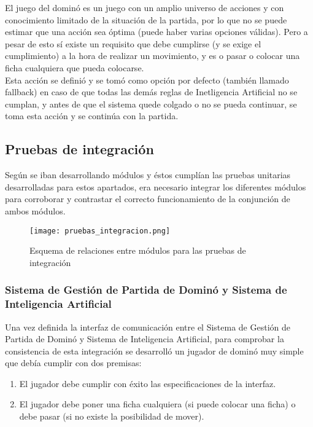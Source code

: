 El juego del dominó es un juego con un amplio universo de acciones y con conocimiento limitado de la situación de la partida,
por lo que no se puede estimar que una acción sea óptima (puede haber varias opciones válidas). Pero a pesar de esto sí existe
un requisito que debe cumplirse (y se exige el cumplimiento) a la hora de realizar un movimiento, y es o pasar o colocar una
ficha cualquiera que pueda colocarse. \\

Esta acción se definió y se tomó como opción por defecto (también llamado fallback) en caso de que todas las demás reglas
de Inetligencia Artificial no se cumplan, y antes de que el sistema quede colgado o no se pueda continuar, se toma esta acción y se continúa
con la partida.


\subsection{Pruebas de integración}

Según se iban desarrollando módulos y éstos cumplían las pruebas unitarias desarrolladas para estos apartados, era necesario
integrar los diferentes módulos para corroborar y contrastar el correcto funcionamiento de la conjunción de ambos módulos.

\begin{figure}[h]
  \label{pruebas_integracion}
  \begin{center}
    \texttt{[image: pruebas\_integracion.png]}
  \end{center}
  \caption{Esquema de relaciones entre módulos para las pruebas de integración}
\end{figure}

\subsubsection{Sistema de Gestión de Partida de Dominó y Sistema de Inteligencia Artificial}

Una vez definida la interfaz de comunicación entre el Sistema de Gestión de Partida de Dominó y Sistema de Inteligencia
Artificial, para comprobar la consistencia de esta integración se desarrolló un jugador de dominó muy simple que debía
cumplir con dos premisas:

\begin{enumerate}
    \item El jugador debe cumplir con éxito las especificaciones de la interfaz.
    \item El jugador debe poner una ficha cualquiera (si puede colocar una ficha) o debe pasar (si no existe la posibilidad
            de mover).
\end{enumerate}

